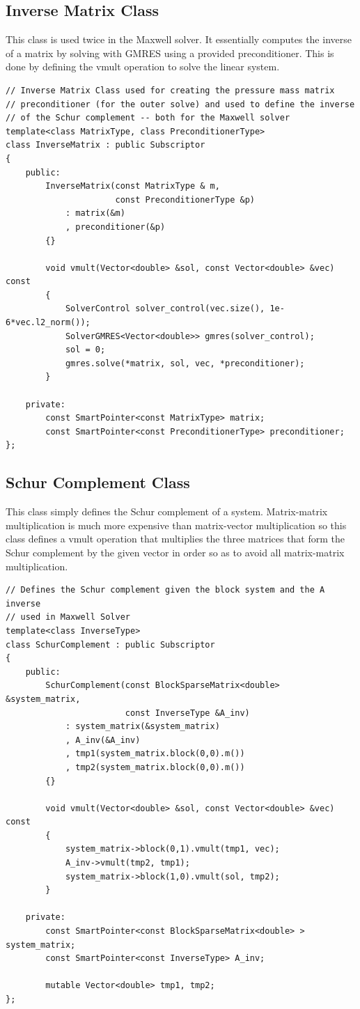 \documentclass{article}
\begin{document}
\subsection*{Inverse Matrix Class}
This class is used twice in the Maxwell solver. It essentially computes the inverse of a matrix by solving with GMRES using a provided preconditioner. This is done by defining the vmult operation to solve the linear system.

\begin{lstlisting}
// Inverse Matrix Class used for creating the pressure mass matrix
// preconditioner (for the outer solve) and used to define the inverse
// of the Schur complement -- both for the Maxwell solver
template<class MatrixType, class PreconditionerType>
class InverseMatrix : public Subscriptor
{
    public:
        InverseMatrix(const MatrixType & m,
                      const PreconditionerType &p)
            : matrix(&m)
            , preconditioner(&p)
        {}

        void vmult(Vector<double> &sol, const Vector<double> &vec) const
        {
            SolverControl solver_control(vec.size(), 1e-6*vec.l2_norm());
            SolverGMRES<Vector<double>> gmres(solver_control);
            sol = 0;
            gmres.solve(*matrix, sol, vec, *preconditioner);
        }

    private:
        const SmartPointer<const MatrixType> matrix;
        const SmartPointer<const PreconditionerType> preconditioner;
};
\end{lstlisting}

\subsection*{Schur Complement Class}
This class simply defines the Schur complement of a system. Matrix-matrix multiplication is much more expensive than matrix-vector multiplication so this class defines a vmult operation that multiplies the three matrices that form the Schur complement by the given vector in order so as to avoid all matrix-matrix multiplication.
\begin{lstlisting}
// Defines the Schur complement given the block system and the A inverse
// used in Maxwell Solver
template<class InverseType>
class SchurComplement : public Subscriptor
{
    public:
        SchurComplement(const BlockSparseMatrix<double> &system_matrix,
                        const InverseType &A_inv)
            : system_matrix(&system_matrix)
            , A_inv(&A_inv)
            , tmp1(system_matrix.block(0,0).m())
            , tmp2(system_matrix.block(0,0).m())
        {}

        void vmult(Vector<double> &sol, const Vector<double> &vec) const
        {
            system_matrix->block(0,1).vmult(tmp1, vec);
            A_inv->vmult(tmp2, tmp1);
            system_matrix->block(1,0).vmult(sol, tmp2);
        }

    private:
        const SmartPointer<const BlockSparseMatrix<double> > system_matrix;
        const SmartPointer<const InverseType> A_inv;

        mutable Vector<double> tmp1, tmp2;
};
\end{lstlisting}
\end{document}

